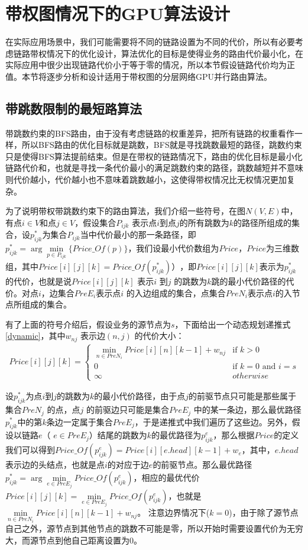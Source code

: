 \section{带权图情况下的GPU算法设计}

在实际应用场景中，我们可能需要将不同的链路设置为不同的代价，所以有必要考虑链路带权情况下的优化设计，算法优化的目标是使得业务的路由代价最小化，在实际应用中很少出现链路代价小于等于零的情况，所以本节假设链路代价均为正值。本节将逐步分析和设计适用于带权图的分层网络GPU并行路由算法。
\subsection{带跳数限制的最短路算法}
带跳数约束的BFS路由，由于没有考虑链路的权重差异，把所有链路的权重看作一样，所以BFS路由的优化目标就是跳数，BFS就是寻找跳数最短的路径，跳数约束只是使得BFS算法提前结束。但是在带权的链路情况下，路由的优化目标是最小化链路代价和，也就是寻找一条代价最小的满足跳数约束的路径，跳数越短并不意味则代价越小，代价越小也不意味着跳数越小，这使得带权情况比无权情况更加复杂。

为了说明带权带跳数约束下的路由算法，我们介绍一些符号，在图$N(V,E)$中，有点$i \in V$和点$j \in V$，假设集合$P_{ijk}$ 表示点$i$到点$j$的所有跳数为$k$的路径所组成的集合，设$p_{ijk}^*$为集合$P_{ijk}$当中代价最小的那一条路径，即$p_{ijk}^* =\arg\min\limits_{p \in P_{ijk}}\{Price\_Of(p)\}$，我们设最小代价数组为$Price$，$Price$为三维数组，其中$Price[i][j][k]=Price\_Of(p_{ijk}^*) ）$，即$Price[i][j][k]$表示为$p_{ijk}^*$ 的代价，也就是说$Price[i][j][k]$ 表示$i$ 到$j$ 的跳数为$k$跳的最小代价路径的代价。对点$i$，边集合$PreE_i$表示点$i$ 的入边组成的集合，点集合$PreN_i$表示点$i$的入节点所组成的集合。

有了上面的符号介绍后，假设业务的源节点为$s$，下面给出一个动态规划递推式\ref{dynamic}，其中$w_{nj}$ 表示边$(n,j)$ 的代价大小：
\begin{equation}\label{dynamic}
\begin{split}
Price[i][j][k]
=\begin{cases}
\min\limits_{n \in PreN_i}{Price[i][n][k-1]+w_{nj}} & \text{if $k>0$}\\
0 & \text{if $k=0$ and $i=s $} \\
\infty &{otherwise}
\end{cases}
\end{split}
\end{equation}

设$p_{ijk}^*$为点$i$到$j$的跳数为$k$的最小代价路径，由于点$j$的前驱节点只可能是那些属于集合$PreN_j$ 的点，点$j$ 的前驱边只可能是集合$PreE_j$ 中的某一条边，那么最优路径$p_{ijk}^*$中的第$k$条边一定属于集合$PreE_j$，于是递推式中我们遍历了这些边。另外，假设以链路$e$（ $e \in PreE_j$）结尾的跳数为$k$的最优路径为$p_{ijk}^e$，那么根据$Price$的定义我们可以得到$Price\_Of(p_{ijk}^e)=Price[i][e.head][k-1]+w_e$，其中，$e.head$表示边的头结点，也就是点$i$的对应于边$e$的前驱节点。那么最优路径$p_{ijk}^*=\arg\min\limits_{e \in PreE_j}{Price\_Of(p_{ijk}^e)}$，相应的最优代价$Price[i][j][k]=\min\limits_{e \in PreE_j}{Price\_Of(p_{ijk}^e)}$，也就是$\min\limits_{n \in PreN_i}{Price[i][n][k-1]+w_{nj}}$。 注意边界情况下($k=0$)，由于除了源节点自己之外，源节点到其他节点的跳数不可能是零，所以开始时需要设置代价为无穷大，而源节点到他自己距离设置为0。

